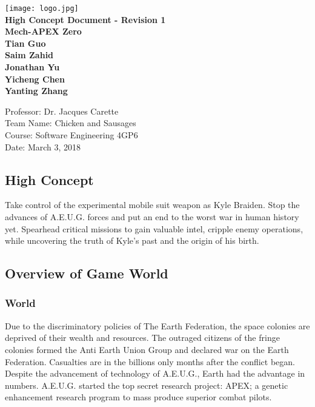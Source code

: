 \documentclass{article}
\begin{document}

\begin{titlepage}
    \begin{center}
        \vspace*{1cm}
        \texttt{[image: logo.jpg]}
        \\
        \textbf{\Large High Concept Document - Revision 1}
        \vspace{0.5cm}
        \textbf{\Large  \\Mech-APEX Zero}
        \vspace{1cm}
        \textbf{\\Tian Guo\\Saim Zahid\\Jonathan Yu\\ Yicheng Chen \\Yanting Zhang }
        \vfill
        \vspace{0.8cm}
        \begin{flushright}
        Professor: Dr. Jacques Carette\\
        Team Name: Chicken and Sausages\\
        Course: Software Engineering 4GP6\\
        Date: March 3, 2018
        \end{flushright}
    \end{center}
\end{titlepage}

\subsection*{High Concept}
Take control of the experimental mobile suit weapon as Kyle Braiden. Stop the advances of A.E.U.G. forces and put an end to the worst war in human history yet. Spearhead critical missions to gain valuable intel, cripple enemy operations, while uncovering the truth of Kyle’s past and the origin of his birth.

\subsection*{Overview of Game World}
    \subsubsection*{World}
     Due to the discriminatory policies of The Earth Federation, the space colonies are deprived of their wealth and resources. The outraged citizens of the fringe colonies formed the Anti Earth Union Group and declared war on the Earth Federation. Casualties are in the billions only months after the conflict began.
    Despite the advancement of technology of A.E.U.G., Earth had the advantage in numbers. A.E.U.G. started the top secret research project: APEX; a genetic enhancement research program to mass produce superior combat pilots.
\end{document}
